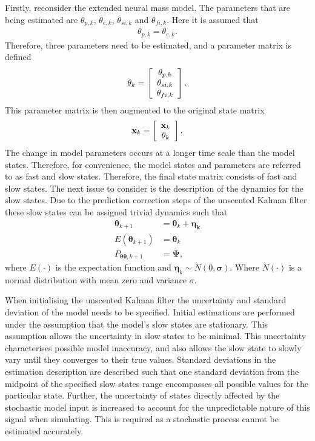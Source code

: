 Firstly, reconsider the extended neural mass model. The parameters that are being estimated are $\theta_{p,k}$, $\theta_{e,k}$, $\theta_{si,k}$ and $\theta_{fi,k}$. Here it is assumed that \begin{align}
\theta_{p,k} = \theta_{e,k}.
\end{align} Therefore, three parameters need to be estimated, and a parameter matrix is defined
\[ \mathbf{\theta}_{k} = \left[ \begin{array}[pos]{c}
\theta_{p,k}\\
\theta_{si,k} \\
\theta_{fi,k} \end{array} \right] .\] This parameter matrix is then augmented to the original state matrix
\[ \mathbf{x}_{k} = \left[ \begin{array}[pos]{c}
\mathbf{x}_{k}\\
\mathbf{\theta}_{k} \end{array} \right] .\] The change in model parameters occurs at a longer time scale than the model states. Therefore, for convenience, the model states and parameters are referred to as fast and slow states. Therefore, the final state matrix consists of fast and slow states. The next issue to consider is the description of the dynamics for the slow states. Due to the prediction correction steps of the unscented Kalman filter these slow states can be assigned trivial dynamics such that
\begin{align}
\label{eqn: parameterdynamics}
\mathbf{\theta}_{k+1} &= \mathbf{\theta}_{k} + \mathbf{\eta_{k}}\\
E(\mathbf{\theta}_{k+1}) &= \mathbf{\theta}_{k}\\
P_{\mathbf{\theta} \mathbf{\theta},k+1} &= \mathbf{\Psi},
\end{align} where $E(\cdot)$ is the expectation function and $\mathbf{\eta}_{k} \sim N(0,\mathbf{\sigma})$. Where $N(\cdot)$ is a normal distribution with mean zero and variance $\sigma$.

When initialising the unscented Kalman filter the uncertainty and standard deviation of the model needs to be specified. Initial estimations are performed under the assumption that the model's slow states are stationary. This assumption allows the uncertainty in slow states to be minimal. This uncertainty characterises possible model inaccuracy, and also allows the slow state to slowly vary until they converges to their true values. Standard deviations in the estimation description are described such that one standard deviation from the midpoint of the specified slow states range encompasses all possible values for the particular state. Further, the uncertainty of states directly affected by the stochastic model input is increased to account for the unpredictable nature of this signal when simulating. This is required as a stochastic process cannot be estimated accurately. 


